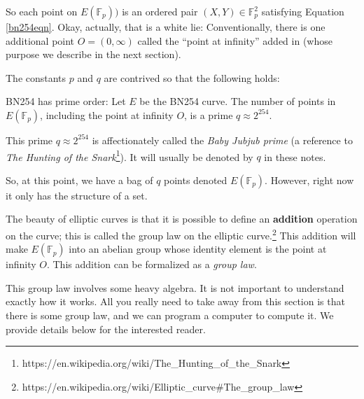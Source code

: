 So each point on \(E( {\mathbb{F}}_{p} ))\) is an ordered pair
\((X,Y) \in {\mathbb{F}}_{p}^{2}\) satisfying Equation \eqref{bn254eqn}. Okay,
actually, that is a white lie: Conventionally, there is one additional
point \(O = (0,\infty)\) called the ``point at infinity'' added in
(whose purpose we describe in the next section).

The constants \(p\) and \(q\) are contrived so that the following holds:

\begin{theorem}
BN254 has prime order: Let \(E\) be the BN254 curve. The number of
points in \(E( {\mathbb{F}}_{p} )\), including the point at
infinity \(O\), is a prime \(q \approx 2^{254}\).
\end{theorem}

\begin{definition}
This prime $q \approx 2^{254}$ is affectionately called the \emph{Baby Jubjub prime}
(a reference to 
\emph{The Hunting of the Snark}\footnote{https://en.wikipedia.org/wiki/The\_Hunting\_of\_the\_Snark}).
It will usually be denoted by $q$ in these notes.
\end{definition}
So, at this point, we have a bag of \(q\) points denoted
\(E( {\mathbb{F}}_{p} )\). However, right now it only has the
structure of a set.

The beauty of elliptic curves is that it is possible to define an
\textbf{addition} operation on the curve; this is called the group law
on the elliptic curve.\footnote{https://en.wikipedia.org/wiki/Elliptic\_curve\#The\_group\_law}
This addition will make \(E( {\mathbb{F}}_{p} )\) into an
abelian group whose identity element is the point at infinity \(O\).
This addition can be formalized as a \emph{group law}.

This group law involves some heavy algebra. It is not important to
understand exactly how it works. All you really need to take away from
this section is that there is some group law, and we can program a
computer to compute it. We provide details below for the interested
reader.

